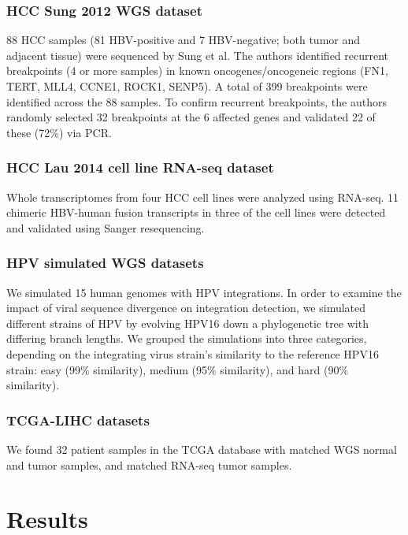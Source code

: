 \documentclass{bioinfo}
\begin{document}
\subsubsection{HCC Sung 2012 WGS dataset}
88 HCC samples (81 HBV-positive and 7 HBV-negative; both tumor and adjacent tissue) were sequenced by Sung et al.  The authors identified recurrent breakpoints (4 or more samples) in known oncogenes/oncogeneic regions (FN1, TERT, MLL4, CCNE1, ROCK1, SENP5).  A total of 399 breakpoints were identified across the 88 samples.  To confirm recurrent breakpoints, the authors randomly selected 32 breakpoints at the 6 affected genes and validated 22 of these (72\%) via PCR.  

\subsubsection{HCC Lau 2014 cell line RNA-seq dataset}
Whole transcriptomes from four HCC cell lines were analyzed using RNA-seq.  11 chimeric HBV-human fusion transcripts in three of the cell lines were detected and validated using Sanger resequencing.  

\subsubsection{HPV simulated WGS datasets}
We simulated 15 human genomes with HPV integrations.  In order to examine the impact of viral sequence divergence on integration detection, we simulated different strains of HPV by evolving HPV16 down a phylogenetic tree with differing branch lengths.  We grouped the simulations into three categories, depending on the integrating virus strain's similarity to the reference HPV16 strain: easy (99\% similarity), medium (95\% similarity), and hard (90\% similarity).

\subsubsection{TCGA-LIHC datasets}
We found 32 patient samples in the TCGA database with matched WGS normal and tumor samples, and matched RNA-seq tumor samples.  

\section{Results}

\end{document}

